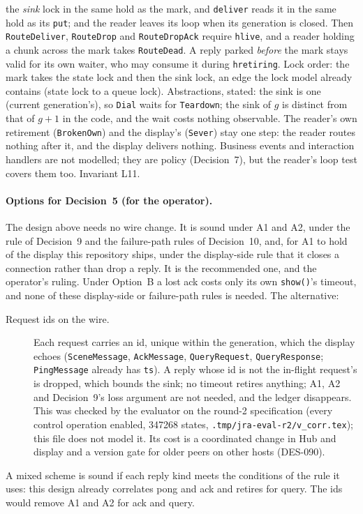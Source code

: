\documentclass[a4paper,10pt,fleqn]{article}
\begin{document}
\begin{enumerate}
    the \emph{sink} lock in the same hold as the mark, and \texttt{deliver}
    reads it in the same hold as its \texttt{put}; and the reader leaves its
    loop when its generation is closed.  Then \texttt{RouteDeliver},
    \texttt{RouteDrop} and \texttt{RouteDropAck} require \texttt{hlive}, and a
    reader holding a chunk across the mark takes \texttt{RouteDead}.  A reply
    parked \emph{before} the mark stays valid for its own waiter, who may
    consume it during \texttt{hretiring}.  Lock order: the mark takes the state
    lock and then the sink lock, an edge the lock model already contains
    (state lock to a queue lock).  Abstractions, stated: the sink is one
    (current generation's), so \texttt{Dial} waits for \texttt{Teardown}; the
    sink of $g$ is distinct from that of $g+1$ in the code, and the wait costs
    nothing observable.  The reader's own retirement (\texttt{BrokenOwn}) and
    the display's (\texttt{Sever}) stay one step: the reader routes nothing
    after it, and the display delivers nothing.  Business events and
    interaction handlers are not modelled; they are policy
    (Decision~7), but the reader's loop test covers them too.  Invariant L11.
\end{enumerate}

\paragraph{Options for Decision~5 (for the operator).}
The design above needs no wire change.  It is sound under A1 and A2, under
the rule of Decision~9 and the failure-path rules of Decision~10, and, for A1
to hold of the display this repository ships, under the display-side rule that
it closes a connection rather than drop a reply.  It is the recommended one,
and the operator's ruling.  Under Option~B a lost ack costs only its own
\texttt{show()}'s timeout, and none of these display-side or failure-path
rules is needed.  The alternative:

\begin{description}
  \item[Request ids on the wire.] Each request carries an id, unique within the
    generation, which the display echoes (\texttt{SceneMessage},
    \texttt{AckMessage}, \texttt{QueryRequest}, \texttt{QueryResponse};
    \texttt{PingMessage} already has \texttt{ts}).  A reply whose id is not the
    in-flight request's is dropped, which bounds the sink; no timeout retires
    anything; A1, A2 and Decision~9's loss argument are not needed, and the
    ledger disappears.  This was checked by the evaluator on the round-2
    specification (every control operation enabled, 347268 states,
    \texttt{.tmp/jra-eval-r2/v\_corr.tex}); this file does not model it.  Its
    cost is a coordinated change in Hub and display and a version gate for
    older peers on other hosts (DES-090).
\end{description}
A mixed scheme is sound if each reply kind meets the conditions of the rule it
uses: this design already correlates pong and ack and retires for query.  The
ids would remove A1 and A2 for ack and query.
\end{document}
